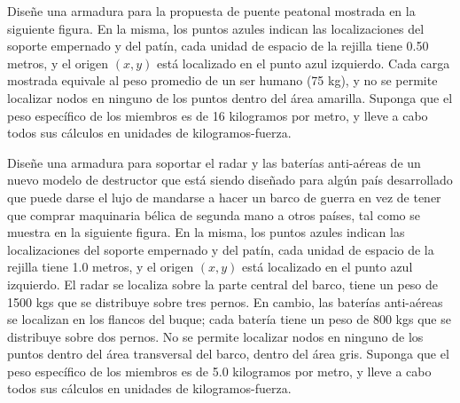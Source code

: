 \documentclass[ a4paper, twoside, 11pt]{article}
\begin{document}
\begin{problem}

Dise\~ne una armadura para la propuesta de puente peatonal mostrada en la siguiente figura. En la misma, los puntos azules indican las localizaciones del soporte empernado y del pat\'in, cada unidad de espacio de la rejilla tiene 0.50 metros, y el origen $(x,y)$ est\'a localizado en el punto azul izquierdo. Cada carga mostrada equivale al peso promedio de un ser humano (75 kg), y no se permite localizar nodos en ninguno de los puntos dentro del \'area amarilla. Suponga que el peso espec\'ifico de los miembros es de 16 kilogramos por metro, y lleve a cabo todos sus c\'alculos en unidades de kilogramos-fuerza. 
\fullskip

\begin{figure}[htb]
\centering
\def\svgwidth{0.8\columnwidth}

\end{figure}
\halfskip

\end{problem}
\fullskip
\newpage

\begin{problem}

Dise\~ne una armadura para soportar el radar y las bater\'ias anti-a\'ereas de un nuevo modelo de destructor que est\'a siendo dise\~nado para alg\'un pa\'is desarrollado que puede darse el lujo de mandarse a hacer un barco de guerra en vez de tener que comprar maquinaria b\'elica de segunda mano a otros pa\'ises, tal como se muestra en la siguiente figura. En la misma, los puntos azules indican las localizaciones del soporte empernado y del pat\'in, cada unidad de espacio de la rejilla tiene 1.0 metros, y el origen $(x,y)$ est\'a localizado en el punto azul izquierdo. El radar se localiza sobre la parte central del barco, tiene un peso de 1500 kgs que se distribuye sobre tres pernos. En cambio, las bater\'ias anti-a\'ereas se localizan en los flancos del buque; cada bater\'ia tiene un peso de 800 kgs que se distribuye sobre dos pernos. No se permite localizar nodos en ninguno de los puntos dentro del \'area transversal del barco, \ie dentro del \'area gris. Suponga que el peso espec\'ifico de los miembros es de 5.0 kilogramos por metro, y lleve a cabo todos sus c\'alculos en unidades de kilogramos-fuerza. 
\fullskip

\begin{figure}[htb]
\centering
\def\svgwidth{0.5\columnwidth}

\end{figure}
\halfskip

\end{problem}
\fullskip
\end{document}
